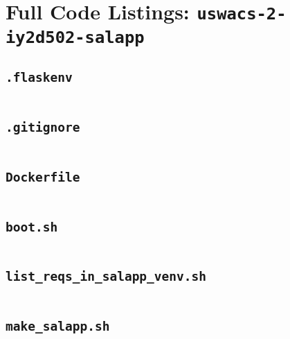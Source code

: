 \section{Full Code Listings: \texttt{uswacs-2-iy2d502-salapp}}
\subsection{\texttt{.flaskenv}}
\begin{codelisting}
\label{fcl:uswacs-2-iy2d502-salapp:.flaskenv}
\inputminted[breakanywhere]{text}{../uswacs-2-iy2d502-salapp/.flaskenv}\end{codelisting}
\subsection{\texttt{.gitignore}}
\begin{codelisting}
\label{fcl:uswacs-2-iy2d502-salapp:.gitignore}
\inputminted[breakanywhere]{text}{../uswacs-2-iy2d502-salapp/.gitignore}\end{codelisting}
\subsection{\texttt{Dockerfile}}
\begin{codelisting}
\label{fcl:uswacs-2-iy2d502-salapp:Dockerfile}
\inputminted[breakanywhere]{dockerfile}{../uswacs-2-iy2d502-salapp/Dockerfile}\end{codelisting}
\subsection{\texttt{boot.sh}}
\begin{codelisting}
\label{fcl:uswacs-2-iy2d502-salapp:boot.sh}
\inputminted[breakanywhere]{bash}{../uswacs-2-iy2d502-salapp/boot.sh}\end{codelisting}
\subsection{\texttt{list\_reqs\_in\_salapp\_venv.sh}}
\begin{codelisting}
\label{fcl:uswacs-2-iy2d502-salapp:list_reqs_in_salapp_venv.sh}
\inputminted[breakanywhere]{bash}{../uswacs-2-iy2d502-salapp/list_reqs_in_salapp_venv.sh}\end{codelisting}
\subsection{\texttt{make\_salapp.sh}}
\begin{codelisting}
\label{fcl:uswacs-2-iy2d502-salapp:make_salapp.sh}
\inputminted[breakanywhere]{bash}{../uswacs-2-iy2d502-salapp/make_salapp.sh}\end{codelisting}

